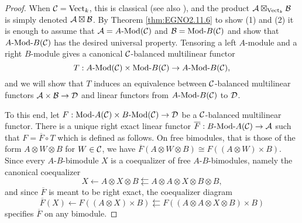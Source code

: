 \documentclass{amsart}
\begin{document}
\begin{proof}
	When $\mathcal C = \mathrm{Vect}_k$, this is classical \cite[Prop 5.13]{MR1106898} (see also \cite[Prop 1.46.2]{EGNO}), and the product $\mathcal A \boxtimes_{\mathrm{Vect}_k} \mathcal B$ is simply denoted $\mathcal A \boxtimes \mathcal B$.
	By Theorem \ref{thm:EGNO2.11.6} to show (1) and (2) it is enough to assume that $\cA = \Mod{A}{}(\cC)$ and $\cB = \Mod{}{B}(\cC)$ and show that $\Mod{A }{B}(\cC)$ has the desired universal property. Tensoring a left $A$-module and a right $B$-module gives a canonical $\mathcal C$-balanced multilinear functor 
		\begin{equation*}
			T: \Mod{A}{}(\cC) \times \Mod{}{B}(\cC) \to \Mod{A}{B}(\cC),  
		\end{equation*}
and we will show that $T$ induces an equivalence between $\mathcal C$-balanced multilinear functors $\mathcal A \times \mathcal B \to \mathcal D$ and linear functors from $\Mod{A}{B}(\cC)$ to $\mathcal D$.
	
	To this end, let $F:\Mod{}{A}(\cC) \times \Mod{B}{}(\cC) \to \cD$ be a $\mathcal C$-balanced multilinear functor.  
	There is a unique right exact linear functor $\overline F: \Mod{B}{A}(\cC) \to \cA$ such that $F = \overline{F} \circ T$ which is defined as follows. On free bimodules, that is those of the form $A \otimes W \otimes B$ for $W \in \mathcal C$, we have $\overline{F}(A \otimes W \otimes B) \cong F((A \otimes W) \times B)$. Since  every $A$-$B$-bimodule $X$ is a coequalizer of free $A$-$B$-bimodules, namely the canonical coequalizer  
	\begin{equation*}
		X \leftarrow A \otimes X \otimes B \leftleftarrows A \otimes A \otimes X \otimes B \otimes B,
	\end{equation*}
	and since $\overline{F}$ is meant to be right exact, the coequalizer diagram
	\begin{equation*}
		\overline{F}(X) \leftarrow F((A \otimes X) \times B) \leftleftarrows F((A \otimes A \otimes X \otimes B) \times B)
	\end{equation*}
specifies $\overline{F}$ on any bimodule.
%	
\end{proof}
\end{document}
